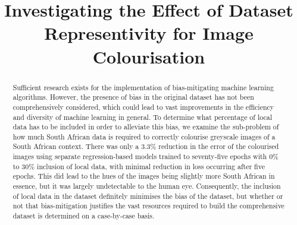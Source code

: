 \documentclass[conference]{IEEEtran}
\begin{document}
\title{Investigating the Effect of Dataset Representivity for Image Colourisation}

\author{
\and
{} 
\and
{}
}

\maketitle

\begin{abstract}

Sufficient research exists for the implementation of bias-mitigating machine learning algorithms. However, the presence of bias in the original dataset has not been comprehensively considered, which could lead to vast improvements in the efficiency and diversity of machine learning in general. To determine what percentage of local data has to be included in order to alleviate this bias, we examine the sub-problem of how much South African data is required to correctly colourise greyscale images of a South African context. There was only a 3.3\% reduction in the error of the colourised images using separate regression-based models trained to seventy-five epochs with 0\% to 30\% inclusion of local data, with minimal reduction in loss occurring after five epochs. This did lead to the hues of the images being slightly more South African in essence, but it was largely undetectable to the human eye. Consequently, the inclusion of local data in the dataset definitely minimises the bias of the dataset, but whether or not that bias-mitigation justifies the vast resources required to build the comprehensive dataset is determined on a case-by-case basis.

\end{abstract}
\end{document}
